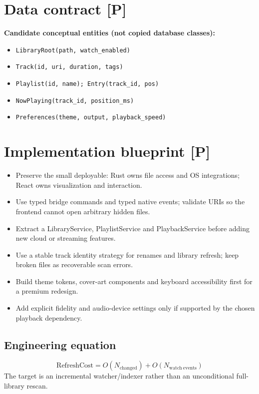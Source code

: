 \documentclass[10pt,a4paper,oneside]{report}
\begin{document}
\section{Data contract [P]}
\begin{evidencebox}\small\textbf{Candidate conceptual entities (not copied database classes):}\par
\begin{itemize}[leftmargin=*,itemsep=1pt,topsep=2pt]
\item \texttt{LibraryRoot(path, watch\_enabled)}
\item \texttt{Track(id, uri, duration, tags)}
\item \texttt{Playlist(id, name); Entry(track\_id, pos)}
\item \texttt{NowPlaying(track\_id, position\_ms)}
\item \texttt{Preferences(theme, output, playback\_speed)}
\end{itemize}\end{evidencebox}
\section{Implementation blueprint [P]}
\begin{itemize}[leftmargin=*,itemsep=2pt,topsep=3pt]
\item Preserve the small deployable: Rust owns file access and OS integrations; React owns visualization and interaction.
\item Use typed bridge commands and typed native events; validate URIs so the frontend cannot open arbitrary hidden files.
\item Extract a LibraryService, PlaylistService and PlaybackService before adding new cloud or streaming features.
\item Use a stable track identity strategy for renames and library refresh; keep broken files as recoverable scan errors.
\item Build theme tokens, cover-art components and keyboard accessibility first for a premium redesign.
\item Add explicit fidelity and audio-device settings only if supported by the chosen playback dependency.
\end{itemize}
\subsection*{Engineering equation}
\begin{equation*}\mathrm{RefreshCost}=O(N_{\mathrm{changed}})+O(N_{\mathrm{watch\ events}})\end{equation*}
The target is an incremental watcher/indexer rather than an unconditional full-library rescan.\par
\end{document}
